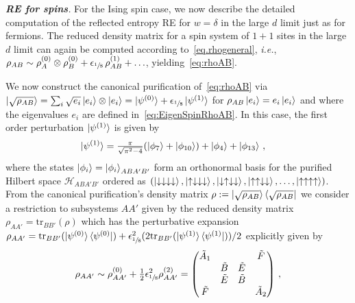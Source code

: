 \documentclass[prl,a4paper,notitlepage,twocolumn,superscriptaddress,longbibliography,reprint]{revtex4-2}
\newcommand{\ie}{{\it i.e.},\ }
\newcommand{\mysection}[1]{{\vspace{10 pt}\noindent \emph{{\textbf{#1}}.}}}
\begin{document}
\mysection{RE for spins} For the Ising spin case, we now describe the detailed computation of the reflected entropy RE for $w=\delta$ in the large $d$ limit just as for fermions. The reduced density matrix for a spin system of $1+1$ sites in the large $d$ limit can again be computed according to~\eqref{eq.rhogeneral}, \ie $\rho_{AB} \sim \rho^{(0)}_{A} \otimes \rho^{(0)}_{B}+\epsilon_{\sfrac{1}{8}}\, \rho^{(1)}_{AB}+\ldots$, yielding~\eqref{eq:rhoAB}.

We now construct the canonical purification of~\eqref{eq:rhoAB} via $\ket{\sqrt{\rho_{AB}}}=\sum_{i}\sqrt{e_{i}}\ket{e_{i}}\otimes\ket{e_{i}}=\ket{\psi^{(0)}}+\epsilon_{\sfrac{1}{8}}\ket{\psi^{(1)}}$ for $\rho_{AB}\ket{e_{i}}=e_{i}\ket{e_{i}}$ and where the eigenvalues $e_{i}$ are defined in~\eqref{eq:EigenSpinRhoAB}. In this case, the first order perturbation $\ket{\psi^{(1)}}$ is given by
\begin{align} \label{EQ_PSI1_ISING}
\begin{split}
    \ket{\psi^{(1)}}&= \tfrac{\pi}{\sqrt{\pi^{2}-4}}(\ket{\phi_{7}}+\ket{\phi_{10}})+\ket{\phi_{4}}+\ket{\phi_{13}}\, ,
    \end{split}
\end{align}
where the states $\ket{\phi_{i}}=\ket{\phi_{i}}_{ABA'B'}$ form an orthonormal basis for the purified Hilbert space $\mathcal{H}_{ABA'B'}$ ordered as $(\ket{\downarrow\downarrow\downarrow\downarrow},\ket{\uparrow\downarrow\downarrow\downarrow},\ket{\downarrow\uparrow\downarrow\downarrow},\ket{\uparrow\uparrow\downarrow\downarrow},\dots,\ket{\uparrow\uparrow\uparrow\uparrow})$. From the canonical purification's density matrix $\rho:=\ket{\sqrt{\rho_{AB}}}\bra{\sqrt{\rho_{AB}}}$ we consider a restriction to subsystems $AA'$ given by the reduced density matrix $\rho_{AA'}=\textrm{tr}_{BB'}(\rho)$ which has the perturbative expansion $\rho_{AA'}=\mathrm{tr}_{BB'}(\ket{\psi^{(0)}}\bra{\psi^{(0)}})+\epsilon^{2}_{\sfrac{1}{8}}(2\mathrm{tr}_{BB'}(\ket{\psi^{(1)}}\bra{\psi^{(1)}}))/2$ explicitly given by
\begin{align}
\label{EQ_RHO_AA_SPIN}
   \rho_{AA'} \sim\rho^{(0)}_{AA'}+\tfrac{1}{2}\epsilon^{2}_{\sfrac{1}{8}}\rho^{(2)}_{AA'}=
   \begin{pmatrix}
  \tilde{A}_{1} &  &  & \tilde{F} \\
  & \tilde{B} & \tilde{E} & \\
  & \tilde{E} & \tilde{B} &  \\
 \tilde{F} &  &  & \tilde{A}_{2}
    \end{pmatrix} \, ,
\end{align}
\end{document}
